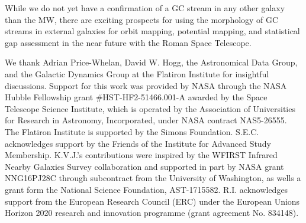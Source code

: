 \documentclass[twocolumn]{aastex631}
\newcommand{\package}[1]{\textsl{#1}}
\begin{document}
While we do not yet have a confirmation of a GC stream in any other galaxy than the MW, there are exciting prospects for using the morphology of GC streams in external galaxies for orbit mapping, potential mapping, and statistical gap assessment in the near future with the Roman Space Telescope. 

\begin{acknowledgements}
We thank Adrian Price-Whelan, David W. Hogg, the Astronomical Data Group, and the Galactic Dynamics Group at the Flatiron Institute for insightful discussions. Support for this work was provided by NASA through the NASA Hubble Fellowship grant \#HST-HF2-51466.001-A awarded by the Space Telescope Science Institute, which is operated by the Association of Universities for Research in Astronomy, Incorporated, under NASA contract NAS5-26555. The Flatiron Institute is supported by the Simons Foundation. S.E.C. acknowledges support by the Friends of the Institute for Advanced Study Membership. K.V.J.'s contributions were inspired by the WFIRST Infrared Nearby Galaxies Survey collaboration and supported in part by NASA grant NNG16PJ28C through subcontract from the University of Washington, as wells a grant form the National Science Foundation, AST-1715582. R.I. acknowledges support from the European Research Council (ERC) under the European Unions Horizon 2020 research and innovation programme (grant agreement No. 834148).
\end{acknowledgements}


\software{
    \package{Astropy}~ \citep{astropy13,astropy18}, 
    ~\package{matplotlib}~ \citep{hunter07}, 
    ~\package{numpy}~ \citep{numpy:2020}, 
    ~\package{scipy}~ \citep{Virtanen:2020}.
}


%
%
\end{document}
